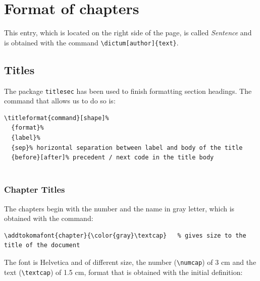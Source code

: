 \documentclass[a4paper,
                             twoside,
                             BCOR1.0cm,
                             DIV11,
                             parskip=full,
                             11pt]{scrbook}
\begin{document}
\title{}
\author{
    \\http://catalatex.blogspot.com/
}
\date{\today}

\maketitle
\tableofcontents

\chapter{Format of chapters}\label{cap:primer}

This entry, which is located on the right side of the page, is called \textit {Sentence} and is obtained with the command
 \verb+\dictum[author]{text}+.
\section{Titles}\label{sec:titles}
The package \verb+titlesec+ has been used to finish formatting section headings. The command that allows us to do so is:
\begin{scriptsize}
\begin{verbatim}
\titleformat{command}[shape]%
  {format}%
  {label}%
  {sep}% horizontal separation between label and body of the title
  {before}[after]% precedent / next code in the title body
 

\end{verbatim}
\end{scriptsize}

\subsection{Chapter Titles}\label{sbsec:captit}
The chapters begin with the number and the name in gray letter, which is obtained with the command:
\begin{scriptsize}
\begin{verbatim}
\addtokomafont{chapter}{\color{gray}\textcap}   % gives size to the title of the document
\end{verbatim}
\end{scriptsize}
The font is Helvetica and of different size, the number (\verb+\numcap+) of 3 cm and the text (\verb+\textcap+) of 1.5 cm, format that is obtained with the initial definition:
\end{document}

